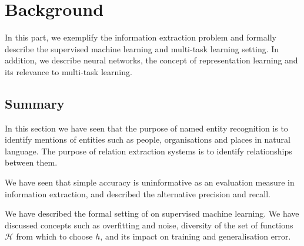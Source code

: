 \chapter{Background}
\label{background}

In this part, we exemplify the information extraction problem and formally describe the supervised machine learning and multi-task learning setting. In addition, we describe neural networks, the concept of representation learning and its relevance to multi-task learning.




\section{Summary}
In this section we have seen that the purpose of named entity recognition is to identify mentions of entities such as people, organisations and places in natural language. The purpose of relation extraction systems is to identify relationships between them. 

We have seen that simple accuracy is uninformative as an evaluation measure in information extraction, and described the alternative precision and recall.

We have described the formal setting of on supervised machine learning. We have discussed concepts such as overfitting and noise, diversity of the set of functions $\mathcal{H}$ from which to choose $h$, and its impact on training and generalisation error.
